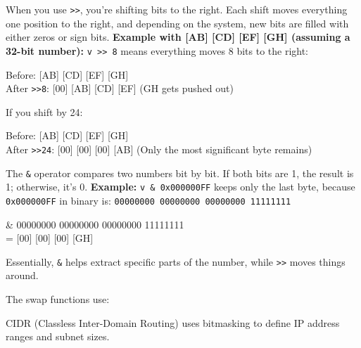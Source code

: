 \begin{NexMainBox}
	\begin{NexMainBox}[dark, crnA, title=\textbf{What happens when you use >> (bit shifting)?}]
		When you use \texttt{>>}, you’re shifting bits to the right. Each shift moves everything one position to the right, and depending on the system, new bits are filled with either zeros or sign bits.
		\textbf{Example with [AB] [CD] [EF] [GH] (assuming a 32-bit number):}
		\texttt{v >> 8} means everything moves 8 bits to the right:
		\begin{NexMainBox}[light, halign=center]
			Before:  [AB] [CD] [EF] [GH]\\
			After \texttt{>>8}:  [00] [AB] [CD] [EF]  (GH gets pushed out)
		\end{NexMainBox}
		If you shift by 24:
		\begin{NexMainBox}[light, halign=center]
			Before:  [AB] [CD] [EF] [GH]\\
			After \texttt{>>24}:  [00] [00] [00] [AB]  (Only the most significant byte remains)
		\end{NexMainBox}
	\end{NexMainBox}
	\begin{NexMainBox}[dark, crnA, title=\textbf{What happens when you use \& (bit masking)?}]
		The \texttt{\&} operator compares two numbers bit by bit. If both bits are 1, the result is 1; otherwise, it’s 0.
		\textbf{Example:} \texttt{v \& 0x000000FF} keeps only the last byte, because \texttt{0x000000FF} in binary is:
		\texttt{00000000 00000000 00000000 11111111}
		\begin{NexMainBox}[light, halign=center]
			[AB] [CD] [EF] [GH] \& 00000000 00000000 00000000 11111111\\
			= [00] [00] [00] [GH]
		\end{NexMainBox}
		Essentially, \texttt{\&} helps extract specific parts of the number, while \texttt{>>} moves things around.
	\end{NexMainBox}
	\begin{NexMainBox}[dark, crnA, title=\textbf{How this applies to swapping endianness}]
		The swap functions use:
		\begin{NexListDark}
		\end{NexListDark}
	\end{NexMainBox}
	\begin{NexMainBox}[dark, crnA, title=\textbf{Bitmasking in CIDR notation}]
		CIDR (Classless Inter-Domain Routing) uses bitmasking to define IP address ranges and subnet sizes.
	\end{NexMainBox}
\end{NexMainBox}

